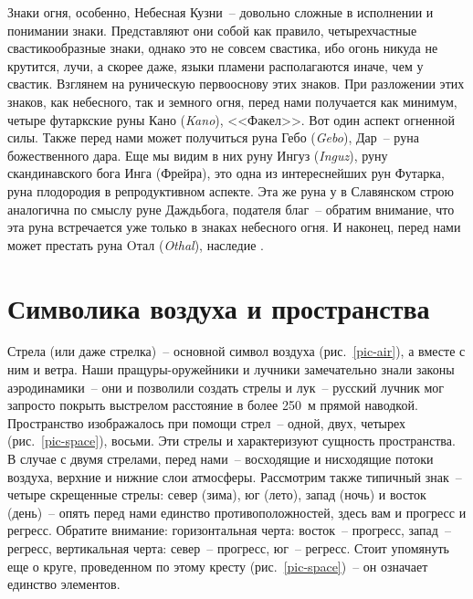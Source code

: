 \documentclass[pscyr,chapters]{hedwork}
\begin{document}
  Знаки огня, особенно, Небесная Кузни~-- довольно сложные в исполнении и
  понимании знаки. Представляют они собой как правило, четырехчастные
  свастикообразные знаки, однако это не совсем свастика, ибо огонь никуда не
  крутится, лучи, а скорее даже, языки пламени располагаются иначе, чем у
  свастик. Взглянем на руническую первооснову этих знаков. При разложении этих
  знаков, как небесного, так и земного огня, перед нами получается как минимум,
  четыре футаркские руны Кано (\emph{Kano}), <<Факел>>. Вот один аспект огненной
  силы. Также перед нами может получиться
  руна Гебо (\emph{Gebo}), Дар~-- руна божественного дара. Еще мы видим в них
  руну Ингуз (\emph{Inguz}), руну скандинавского бога Инга (Фрейра), это одна из
  интереснейших рун Футарка, руна плодородия в репродуктивном аспекте. Эта же
  руна у в Славянском строю аналогична по смыслу руне Даждьбога, подателя
  благ~-- обратим внимание, что эта руна встречается уже только в знаках
  небесного огня. И наконец, перед нами может престать руна Oтал (\emph{Othal}),
  наследие \cite{4}.

  \chapter{Символика воздуха и пространства}

  Стрела (или даже стрелка)~-- основной символ
  воздуха (рис.~\ref{pic-air}), а вместе с ним и ветра. Наши пращуры-оружейники
  и лучники замечательно знали законы аэродинамики~-- они и позволили создать
  стрелы и  лук~-- русский лучник мог запросто покрыть выстрелом расстояние в 
  более 250~м прямой наводкой. Пространство изображалось при помощи стрел~--
  одной, двух, четырех (рис.~\ref{pic-space}), восьми. Эти стрелы и
  характеризуют сущность пространства. В случае с двумя стрелами, перед нами~--
  восходящие и нисходящие потоки воздуха, верхние и нижние слои атмосферы.
  Рассмотрим также типичный знак~-- четыре скрещенные стрелы: север (зима),
  юг (лето), запад (ночь) и восток (день)~-- опять перед нами единство
  противоположностей, здесь вам и прогресс и регресс. Обратите внимание:
  горизонтальная черта: восток~-- прогресс, запад~-- регресс, вертикальная
  черта: север~-- прогресс, юг~-- регресс. Стоит упомянуть еще о круге,
  проведенном по этому кресту (рис.~\ref{pic-space})~-- он означает единство
  элементов.
\end{document}
